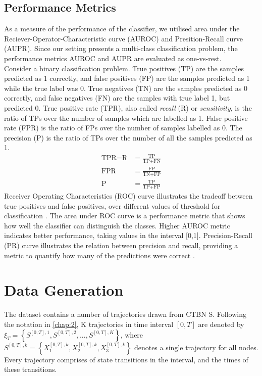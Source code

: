 \subsection{Performance Metrics}
As a measure of the performance of the classifier, we utilised area under the Reciever-Operator-Characteristic curve (AUROC) and Presition-Recall curve (AUPR). Since our setting presents a multi-class classification problem, the
performance metrics AUROC and AUPR are evaluated as one-vs-rest.\\
Consider a binary classification problem. True positives (TP) are the samples predicted as 1 correctly, and false positives (FP) are the samples predicted as 1 while the true label was 0. True negatives (TN) are the samples predicted as 0 correctly, and false negatives (FN) are the samples with true label 1, but predicted 0. True positive rate (TPR), also called \textit{recall} (R) or \textit{sensitivity}, is the ratio of TPs over the number of samples which are labelled as 1. False positive rate (FPR) is the ratio of FPs over the number of samples labelled as 0. The precision (P) is the ratio of TPs over the number of all the samples predicted as 1.
\begin{align}
\text{TPR} = \text{R} &= \frac{\text{TP}}{\text{TP} + \text{FN}} \\
\text{FPR} &= \frac{\text{FP}}{\text{TN} + \text{FP}} \\
\text{P} &= \frac{\text{TP}}{\text{TP} + \text{FP}}
\end{align}
Receiver Operating Characteristics (ROC) curve illustrates the tradeoff between true positives and false positives, over different values of threshold for classification \cite{Robinson2008}. The area under ROC curve is a performance metric that shows how well the classifier can distinguish the classes. Higher AUROC metric indicates better performance, taking values in the interval [0,1]. Precision-Recall (PR) curve illustrates the relation between precision and recall, providing a metric to quantify how many of the predictions were correct \cite{Boyd2013}.
\section{Data Generation}
The dataset contains a number of trajectories drawn from CTBN S. Following the notation in \cref{chap:2}, K trajectories in time interval $ [0, T] $ are denoted by $ \xi_T = \left\lbrace S^{[0,T], 1}, S^{[0,T], 2}, ..., S^{[0,T], K} \right\rbrace  $, where $ S^{[0,T],k} = \left\lbrace X_1^{[0,T],k} , X_2^{[0,T],k}, X_3^{[0,T],k}\right\rbrace $ denotes a single trajectory for all nodes. Every trajectory comprises of state transitions in the interval, and the times of these transitions. 
